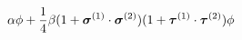\begin{equation}
\alpha \phi + \frac{1}{4} \beta (1+ \mbox{\boldmath $\sigma$}^{(1)} \cdot 
\mbox{\boldmath $\sigma$}^{(2)})
(1+ \mbox{\boldmath $\tau$}^{(1)} \cdot \mbox{\boldmath $\tau$}^{(2)}) \phi
\end{equation}

